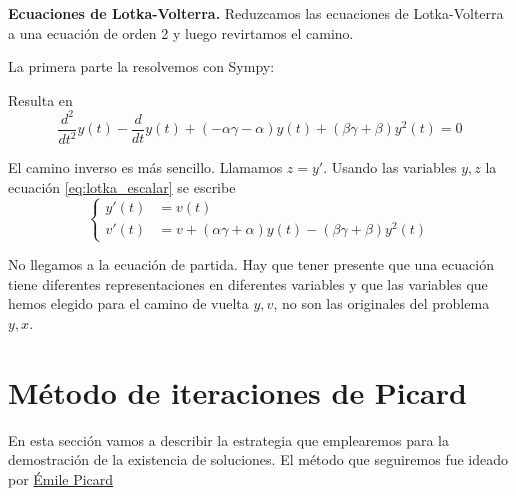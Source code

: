 \begin{ejemplo} \textbf{Ecuaciones de Lotka-Volterra.} Reduzcamos las ecuaciones de Lotka-Volterra a una ecuación de orden 2 y luego revirtamos el camino.

La primera parte la resolvemos con Sympy:

Resulta en
\begin{equation}\label{eq:lotka_escalar}\frac{d^{2}}{d t^{2}}  y{\left (t \right )- \frac{d}{d t} y{\left (t \right )} +
\left(- \alpha \gamma - \alpha\right) y{\left (t \right )} + \left(\beta \gamma + \beta\right) y^{2}{\left (t \right )} }=0
\end{equation}

El camino inverso es más sencillo. Llamamos $z=y'$. Usando las variables $y,z$ la ecuación \eqref{eq:lotka_escalar} se escribe
\[
 \left\{
 \begin{array}{ll}
    y'(t)&=v(t)\\
    v'(t)&=v+\left( \alpha \gamma + \alpha\right) y{\left (t \right )} - \left(\beta \gamma + \beta\right) y^{2}{\left (t \right )}
 \end{array}
 \right.
 \]

 No llegamos a la ecuación de partida. Hay que tener presente que una ecuación tiene diferentes representaciones en diferentes variables y que las variables que hemos elegido para el camino de vuelta $y,v$, no son las originales del problema $y,x$.


\end{ejemplo}


\section{Método de iteraciones de Picard}

En esta sección vamos a describir la estrategia que emplearemos para la demostración de la existencia de soluciones. El método que seguiremos fue ideado por \href{https://es.wikipedia.org/wiki/Charles_%C3%89mile_Picard}{Émile Picard}\link {}

